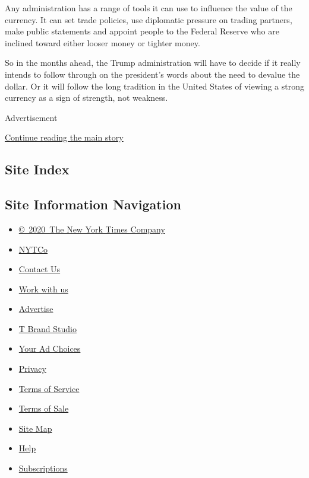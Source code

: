 Any administration has a range of tools it can use to influence the
value of the currency. It can set trade policies, use diplomatic
pressure on trading partners, make public statements and appoint people
to the Federal Reserve who are inclined toward either looser money or
tighter money.

So in the months ahead, the Trump administration will have to decide if
it really intends to follow through on the president's words about the
need to devalue the dollar. Or it will follow the long tradition in the
United States of viewing a strong currency as a sign of strength, not
weakness.

Advertisement

\protect\hyperlink{after-bottom}{Continue reading the main story}

\hypertarget{site-index}{%
\subsection{Site Index}\label{site-index}}

\hypertarget{site-information-navigation}{%
\subsection{Site Information
Navigation}\label{site-information-navigation}}

\begin{itemize}
\tightlist
\item
  \href{https://help.nytimes.com/hc/en-us/articles/115014792127-Copyright-notice}{©~2020~The
  New York Times Company}
\end{itemize}

\begin{itemize}
\tightlist
\item
  \href{https://www.nytco.com/}{NYTCo}
\item
  \href{https://help.nytimes.com/hc/en-us/articles/115015385887-Contact-Us}{Contact
  Us}
\item
  \href{https://www.nytco.com/careers/}{Work with us}
\item
  \href{https://nytmediakit.com/}{Advertise}
\item
  \href{http://www.tbrandstudio.com/}{T Brand Studio}
\item
  \href{https://www.nytimes.com/privacy/cookie-policy\#how-do-i-manage-trackers}{Your
  Ad Choices}
\item
  \href{https://www.nytimes.com/privacy}{Privacy}
\item
  \href{https://help.nytimes.com/hc/en-us/articles/115014893428-Terms-of-service}{Terms
  of Service}
\item
  \href{https://help.nytimes.com/hc/en-us/articles/115014893968-Terms-of-sale}{Terms
  of Sale}
\item
  \href{https://spiderbites.nytimes.com}{Site Map}
\item
  \href{https://help.nytimes.com/hc/en-us}{Help}
\item
  \href{https://www.nytimes.com/subscription?campaignId=37WXW}{Subscriptions}
\end{itemize}
